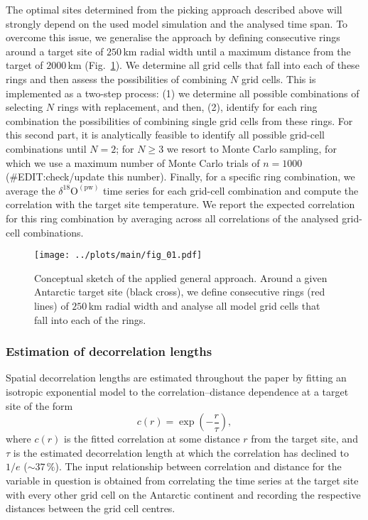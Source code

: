\documentclass[cp, manuscript]{copernicus}
\begin{document}
The optimal sites determined from the picking approach described above will
strongly depend on the used model simulation and the analysed time span. To
overcome this issue, we generalise the approach by defining consecutive rings
around a target site of $250$\,km radial width until a maximum distance from the
target of $2000$\,km (Fig.~\ref{fig:concept}). We determine all grid cells that fall into
each of these rings and then assess the possibilities of combining $N$ grid
cells. This is implemented as a two-step process: (1) we determine all possible
combinations of selecting $N$ rings with replacement, and then, (2), identify
for each ring combination the possibilities of combining single grid cells from
these rings. For this second part, it is analytically feasible to identify all
possible grid-cell combinations until $N=2$; for $N\geq3$ we resort to Monte
Carlo sampling, for which we use a maximum number of Monte Carlo trials of
$n=1000$ (\#EDIT:check/update this number). Finally, for a specific ring
combination, we average the $\delta^{18}\mathrm{O}^{\mathrm{(pw)}}$ time series
for each grid-cell combination and compute the correlation with the target
site temperature. We report the expected correlation for this ring combination
by averaging across all correlations of the analysed grid-cell combinations.

\begin{figure}[t]%
\centering
\texttt{[image: ../plots/main/fig\_01.pdf]}
\caption[Conceptual approach]{%
  Conceptual sketch of the applied general approach. Around a given Antarctic
  target site (black cross), we define consecutive rings (red lines) of
  $250$\,km radial width and analyse all model grid cells that fall into each of
  the rings.}
\label{fig:concept}%
\end{figure}%

\subsubsection{Estimation of decorrelation lengths}\label{methods:decor.model}

Spatial decorrelation lengths are estimated throughout the paper by fitting an
isotropic exponential model to the correlation--distance dependence at a target
site of the form
\begin{equation}\label{eq:decor.model}
c(r) = \exp{\left(-\frac{r}{\tau}\right)},
\end{equation}
where $c(r)$ is the fitted correlation at some distance $r$ from the target
site, and $\tau$ is the estimated decorrelation length at which the correlation
has declined to $1/e$ ($\sim37\,\%$). The input relationship between correlation
and distance for the variable in question is obtained from correlating the time
series at the target site with every other grid cell on the Antarctic continent
and recording the respective distances between the grid cell
centres.
\end{document}
